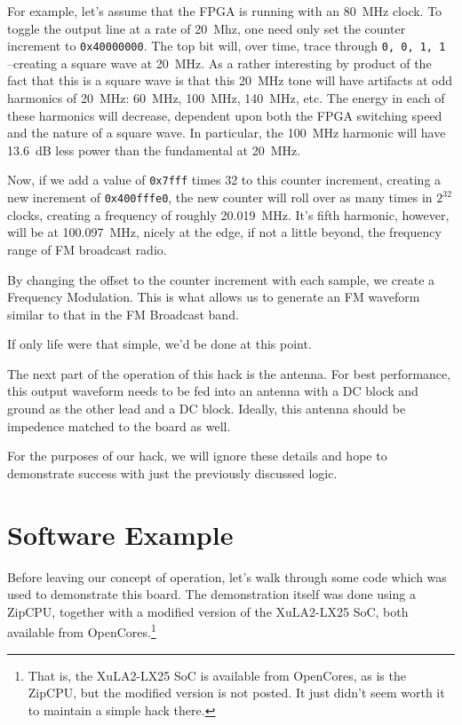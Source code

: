 \documentclass{gqtekspec}
\begin{document}
For example, let's assume that the FPGA is running with an 80~MHz clock.
To toggle the output line at a rate of 20~Mhz, one need only set the counter
increment to {\tt 0x40000000}.  The top bit will, over time, trace through
{\tt 0, 0, 1, 1 }--creating a square wave at 20~MHz.  As a rather interesting
by product of the fact that this is a square wave is that this 20~MHz tone
will have artifacts at odd harmonics of 20~MHz: 60~MHz, 100~MHz, 140~MHz, etc.
The energy in each of these harmonics will decrease, dependent upon both the
FPGA switching speed and the nature of a square wave.  In particular, the
100~MHz harmonic will have 13.6~dB less power than the fundamental at 20~MHz.

Now, if we add a value of {\tt 0x7fff} times 32 to this counter increment,
creating a new increment of {\tt 0x400fffe0}, the new counter will roll over
as many times in $2^{32}$ clocks, creating a frequency of roughly 
20.019~MHz. It's fifth harmonic, however, will be at 100.097~MHz, nicely at the
edge, if not a little beyond, the frequency range of FM broadcast radio.

By changing the offset to the counter increment with each sample, we create a
Frequency Modulation.  This is what allows us to generate an FM waveform
similar to that in the FM Broadcast band.

If only life were that simple, we'd be done at this point.

The next part of the operation of this hack is the antenna.  For best
performance, this output waveform needs to be fed into an antenna with a DC
block and ground as the other lead and a DC block.  Ideally, this antenna
should be impedence matched to the board as well.

For the purposes of our hack, we will ignore these details and hope to 
demonstrate success with just the previously discussed logic.

\section{Software Example}

Before leaving our concept of operation, let's walk through some code which 
was used to demonstrate this board.  The demonstration itself was done using
a ZipCPU, together with a modified version of the XuLA2-LX25 SoC, both
available from OpenCores.\footnote{That is, the XuLA2-LX25 SoC is available
from OpenCores, as is the ZipCPU, but the modified version is not posted.  It
just didn't seem worth it to maintain a simple hack there.}
\end{document}
